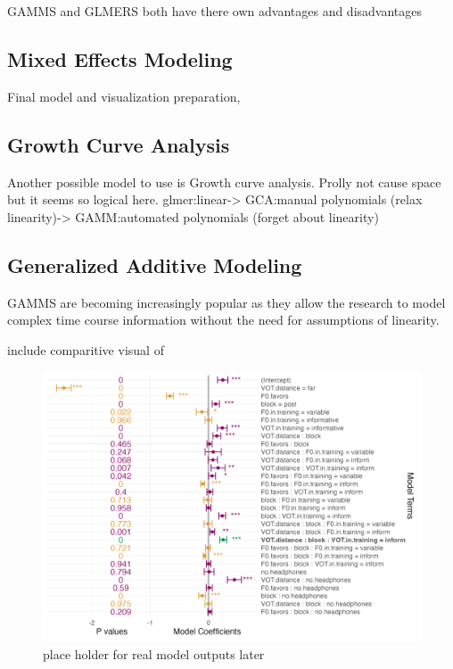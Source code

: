 


GAMMS and GLMERS both have there own advantages and disadvantages \parencite{Ito_Knoeferle_2022}

\subsection{Mixed Effects Modeling}
Final model and visualization preparation, 





\subsection{Growth Curve Analysis}

Another possible model to use is Growth curve analysis. Prolly not cause space but it seems so logical here. glmer:linear-> GCA:manual polynomials (relax linearity)-> GAMM:automated polynomials (forget about linearity)


\subsection{Generalized Additive Modeling}



GAMMS are becoming increasingly popular as they allow the research to model complex time course information without the need for assumptions of linearity.

include comparitive visual of 
\begin{figure}[h]
    \centering
    \includegraphics[width=\textwidth]{figures/model_outputs}
    \caption{place holder for real model outputs later}
    \label{fig:model_outputs}
\end{figure}